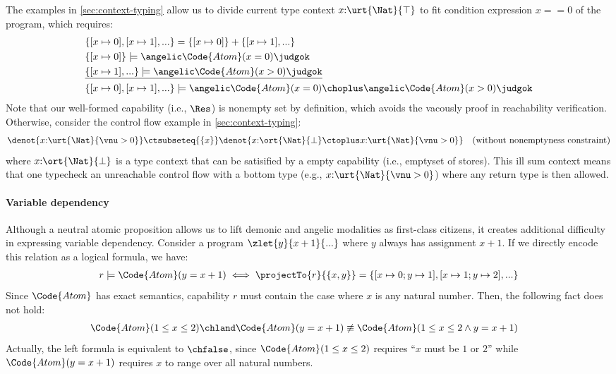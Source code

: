 \begin{definition}
\begin{example} The examples in \autoref{sec:context-typing} allow us to divide current type context $x{:}\urt{\Nat}{\top}$ to fit condition expression $x == 0$ of the program, which requires:
\begin{align*}
  &\{[x\mapsto 0], [x\mapsto 1], ... \} = \{[x\mapsto 0]\} + \{[x\mapsto 1], ... \}
  \\&\{[x\mapsto 0]\} \models \angelic \Code{Atom}(x = 0) \judgok
  \\&\underline{\{[x\mapsto 1], ... \} \models \angelic \Code{Atom}(x > 0) \judgok}
  \\&\{[x\mapsto 0], [x\mapsto 1], ... \} \models \angelic \Code{Atom}(x = 0) \choplus \angelic \Code{Atom}(x > 0) \judgok
\end{align*}\noindent
Note that our well-formed capability (i.e., $\Res$) is nonempty set by definition, which avoids the vacously proof in reachability verification. Otherwise, consider the control flow example in \autoref{sec:context-typing}:
\begin{align*}
  \denot{x{:}\urt{\Nat}{\vnu > 0}} \ctsubseteq{\{x\}} \denot{x{:}\ort{\Nat}{\bot} \ctoplus x{:}\urt{\Nat}{\vnu > 0}}  \quad \text{(without nonemptyness constraint)}
\end{align*}\noindent
where $x{:}\ort{\Nat}{\bot}$ is a type context that can be satisified by a empty capability (i.e., emptyset of stores). This ill sum context means that one typecheck an unreachable control flow with a bottom type (e.g., $x{:}\urt{\Nat}{\vnu > 0}$) where any return type is then allowed.
\end{example}

\paragraph{Variable dependency} Although a neutral atomic proposition allows us to lift demonic and angelic modalities as first-class citizens, it creates additional difficulty in expressing variable dependency. Consider a program $\zlet{y}{x + 1}{...}$ where $y$ always has assignment $x + 1$. If we directly encode this relation as a logical formula, we have:
\begin{align*}
  r \models \Code{Atom}(y = x + 1)  \iff \projectTo{r}{\{x, y\}} = \{ [x \mapsto 0; y \mapsto 1], [x \mapsto 1; y \mapsto 2], ... \}
\end{align*}\noindent
Since $\Code{Atom}$ has exact semantics, capability $r$ must contain the case where $x$ is any natural number. Then, the following fact does not hold:
\begin{align*}
  \Code{Atom}(1 \leq x \leq 2) \chland \Code{Atom}(y = x + 1) &\not\equiv \Code{Atom}(1 \leq x \leq 2 \land y = x + 1) 
\end{align*}\noindent
Actually, the left formula is equivalent to $\chfalse$, since $\Code{Atom}(1 \leq x \leq 2)$ requires ``$x$ must be $1$ or $2$'' while $\Code{Atom}(y = x + 1)$ requires $x$ to range over all natural numbers.


\end{definition}
